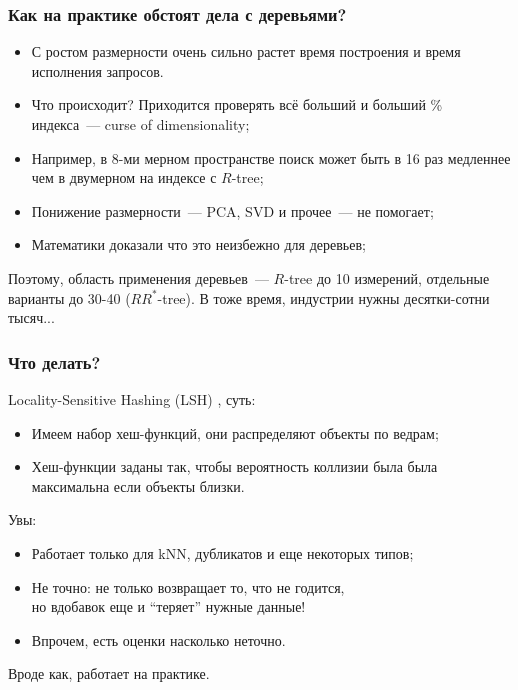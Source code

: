 \documentclass{beamer}
\begin{document}
\begin{frame}
\frametitle{Как на практике обстоят дела с деревьями?}

\begin{itemize}
  \setlength\itemsep{1em}
  \item С ростом размерности очень сильно растет время построения и время исполнения запросов.
  \item Что происходит? Приходится проверять всё больший и больший \% индекса~--- \alert{curse of dimensionality};
  \item Например, в 8-ми мерном пространстве поиск может быть в 16 раз медленнее чем в двумерном на индексе с $R$-tree;
  \item Понижение размерности~--- PCA, SVD и прочее~--- не помогает;
  \item \alert{Математики доказали что это неизбежно для деревьев};
\end{itemize}

Поэтому, область применения деревьев~--- $R$-tree до 10 измерений, отдельные варианты до 30-40 ($RR^*$-tree). В тоже время, индустрии нужны десятки-сотни тысяч...

\end{frame}


\begin{frame}
\frametitle{Что делать?}

Locality-Sensitive Hashing (LSH) \cite{Gionis1999}, суть:

\begin{itemize}
  \setlength\itemsep{1em}
  \item Имеем набор хеш-функций, они распределяют объекты по ведрам;
  \item Хеш-функции заданы так, чтобы вероятность коллизии была была максимальна если объекты близки. 
\end{itemize}

Увы:

\begin{itemize}
  \setlength\itemsep{1em}
  \item Работает только для kNN, дубликатов и еще некоторых типов;
  \item Не точно: не только возвращает то, что не годится, \\ но вдобавок еще и ``теряет'' нужные данные!
  \item Впрочем, есть оценки насколько неточно. 
\end{itemize}

Вроде как, работает на практике.

\end{frame}
\end{document}
